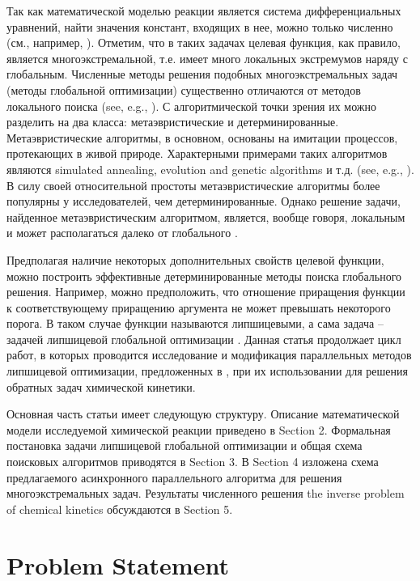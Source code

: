 \documentclass{svproc}
\begin{document}
Так как математической моделью реакции является система дифференциальных уравнений, найти значения констант, входящих в нее, можно только численно (см., например, \cite{RSD}). Отметим, что в таких задачах целевая функция, как правило, является многоэкстремальной, т.е. имеет много локальных экстремумов наряду с глобальным. 
Численные методы решения подобных многоэкстремальных задач (методы глобальной оптимизации) существенно отличаются от методов локального поиска (see, e.g., \cite{Sergeyev2017,PaulaviciusZilinskas2014}).  
С алгоритмической точки зрения их можно разделить на два класса: метаэвристические и детерминированные. Метаэвристические алгоритмы, в основном, основаны на имитации процессов, протекающих в живой природе.
Характерными примерами таких алгоритмов являются simulated annealing, evolution and genetic algorithms и т.д. (see, e.g., \cite{Battiti2009,Eiben2015}). В силу своей относительной простоты метаэвристические алгоритмы более популярны у исследователей, чем детерминированные.  Однако решение задачи, найденное метаэвристическим алгоритмом, является, вообще говоря, локальным и может располагаться далеко от глобального \cite{Kvasov2018}. 

Предполагая наличие некоторых дополнительных свойств целевой функции, можно построить эффективные детерминированные методы поиска глобального решения.
Например, можно предположить, что отношение приращения функции к соответствующему приращению аргумента не может превышать некоторого порога. В таком случае функции называются липшицевыми, а сама задача -- задачей липшицевой глобальной оптимизации . 
Данная статья продолжает цикл работ, в которых проводится исследование и модификация параллельных методов липшицевой оптимизации, предложенных в \cite{Strongin2000}, при их использовании для решения обратных задач химической кинетики. 

Основная часть статьи имеет следующую структуру. Описание математической модели исследуемой химической реакции приведено в Section 2. Формальная постановка задачи липшицевой глобальной оптимизации и общая схема поисковых алгоритмов приводятся в Section 3. В Section 4 изложена схема предлагаемого асинхронного параллельного алгоритма для решения многоэкстремальных задач. Результаты численного решения the inverse problem of chemical kinetics обсуждаются в Section 5.


\section{Problem Statement}\label{Sec_math_mod}
\end{document}
